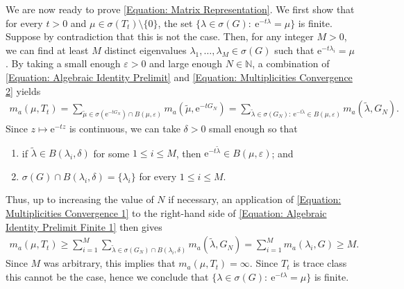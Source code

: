 \documentclass{amsart}
\numberwithin{equation}{section}
\theoremstyle{definition}
\newcommand\de{\delta}
\newcommand\eps{\varepsilon}
\newcommand\la{\lambda}
\newcommand\si{\sigma}
\newcommand\mbb{\mathbb}
\newcommand\mr{\mathrm}
\begin{document}
We are now ready to prove \eqref{Equation: Matrix Representation}.
We first show that for every $t>0$ and $\mu\in\si(T_t)\setminus\{0\}$, the set $\{\la\in\si(G):~\mr e^{-t\la}=\mu\}$
is finite. Suppose by contradiction that this is not the case. Then, for any integer $M>0$, we can
find at least $M$ distinct eigenvalues $\la_1,\ldots,\la_M\in\si(G)$ such that $\mr e^{-t\la_i}=\mu$.
By taking a small enough $\eps>0$ and large enough $N\in\mbb N$, a combination of
\eqref{Equation: Algebraic Identity Prelimit} and \eqref{Equation: Multiplicities Convergence 2} yields
\begin{align}
\label{Equation: Algebraic Identity Prelimit Finite 1}
m_a(\mu,T_t)=\sum_{\tilde\mu\in\si(\mr e^{-t G_N})\cap B(\mu,\eps)}m_a(\tilde\mu,\mr e^{-tG_N})
=\sum_{\tilde\la\in\si(G_N):~\mr e^{-t\tilde\la}\in B(\mu,\eps)}m_a(\tilde\la,G_N).
\end{align}
Since $z\mapsto\mr e^{-t z}$ is continuous, we can take $\de>0$ small enough so that
\begin{enumerate}
\item if $\tilde\la\in B(\la_i,\de)$ for some $1\leq i\leq M$, then $\mr e^{-t\tilde\la}\in B(\mu,\eps)$; and
\item $\si(G)\cap B(\la_i,\de)=\{\la_i\}$ for every $1\leq i\leq M$.
\end{enumerate}
Thus, up to increasing the value of $N$ if necessary, an application of \eqref{Equation: Multiplicities Convergence 1}
to the right-hand side of \eqref{Equation: Algebraic Identity Prelimit Finite 1} then gives
\begin{align}
\label{Equation: Algebraic Identity Prelimit Finite 2}
m_a(\mu,T_t)\geq\sum_{i=1}^{M}\sum_{\tilde\la\in\si(G_N)\cap B(\la_i,\de)}m_a(\tilde\la,G_N)
=\sum_{i=1}^Mm_a(\la_i,G)\geq M.
\end{align}
Since $M$ was arbitrary, this implies that $m_a(\mu,T_t)=\infty$. Since $T_t$ is trace class
this cannot be the case, hence
we conclude that $\{\la\in\si(G):~\mr e^{-t\la}=\mu\}$ is finite.

%
\end{document}
